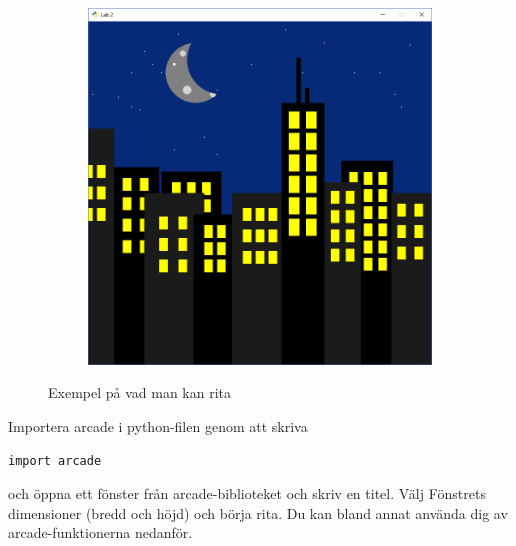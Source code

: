 \documentclass[a4paper,12pt]{article}
\begin{document}
\begin{figure}[!ht]
\begin{subfigure}{.3\textwidth}
\end{subfigure}%
\begin{subfigure}{.3\textwidth}
  \centering
  \includegraphics[height=.7\linewidth]{rita_stad}
\end{subfigure}
\caption{Exempel på vad man kan rita}
\label{fig:rita}
\end{figure}


Importera arcade i python-filen genom att skriva

\begin{lstlisting}
import arcade
\end{lstlisting}

och öppna ett fönster från arcade-biblioteket och skriv en titel. Välj Fönstrets dimensioner (bredd och höjd) och börja rita. Du kan bland annat använda dig av arcade-funktionerna nedanför.
\end{document}
